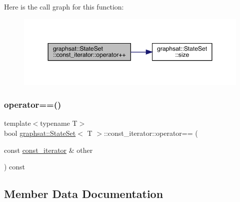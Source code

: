 Here is the call graph for this function\+:
\nopagebreak
\begin{figure}[H]
\begin{center}
\leavevmode
\includegraphics[width=350pt]{classgraphsat_1_1_state_set_1_1const__iterator_aebd760173617e51a4b4831140c43001c_cgraph}
\end{center}
\end{figure}
\mbox{\label{classgraphsat_1_1_state_set_1_1const__iterator_af6c6f17f160d8dd538dfeb3b3f3e76e6}} 
\subsubsection{\texorpdfstring{operator==()}{operator==()}}
{\footnotesize\ttfamily template$<$typename T$>$ \\
bool \mbox{\hyperlink{classgraphsat_1_1_state_set}{graphsat\+::\+State\+Set}}$<$ T $>$\+::const\+\_\+iterator\+::operator== (\begin{DoxyParamCaption}\item[{const \mbox{\hyperlink{classgraphsat_1_1_state_set_1_1const__iterator}{const\+\_\+iterator}} \&}]{other }\end{DoxyParamCaption}) const\hspace{0.3cm}{\ttfamily [inline]}}



\subsection{Member Data Documentation}
\mbox{\label{classgraphsat_1_1_state_set_1_1const__iterator_aa3f0e00b95346e8b87fa80b89f22d7e3}} 
